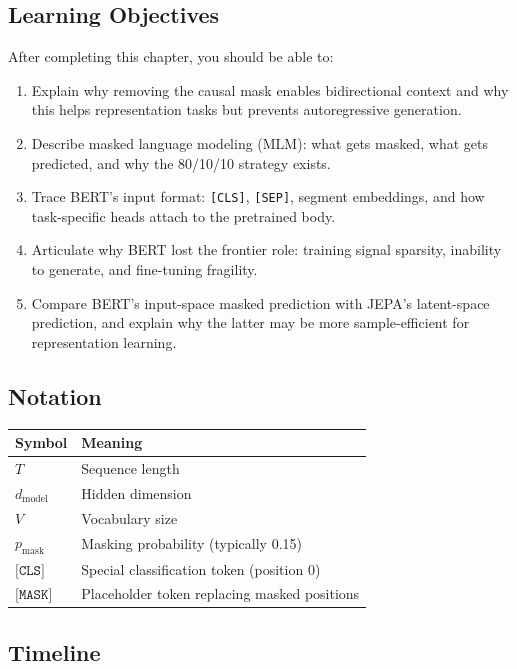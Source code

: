 \subsection*{Learning Objectives}

After completing this chapter, you should be able to:

\begin{enumerate}
  \item Explain why removing the causal mask enables bidirectional context and why this helps representation tasks but prevents autoregressive generation.
  \item Describe masked language modeling (MLM): what gets masked, what gets predicted, and why the 80/10/10 strategy exists.
  \item Trace BERT's input format: \texttt{[CLS]}, \texttt{[SEP]}, segment embeddings, and how task-specific heads attach to the pretrained body.
  \item Articulate why BERT lost the frontier role: training signal sparsity, inability to generate, and fine-tuning fragility.
  \item Compare BERT's input-space masked prediction with JEPA's latent-space prediction, and explain why the latter may be more sample-efficient for representation learning.
\end{enumerate}

\subsection*{Notation}

\begin{center}
\begin{tabular}{ll}
\toprule
Symbol & Meaning \\
\midrule
$T$ & Sequence length \\
$d_{\text{model}}$ & Hidden dimension \\
$V$ & Vocabulary size \\
$p_{\text{mask}}$ & Masking probability (typically 0.15) \\
$\texttt{[CLS]}$ & Special classification token (position 0) \\
$\texttt{[MASK]}$ & Placeholder token replacing masked positions \\
\bottomrule
\end{tabular}
\end{center}

\subsection*{Timeline}


